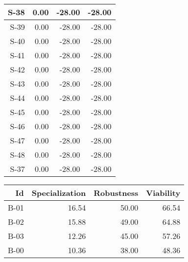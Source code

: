 \begin{tabular}{ | r | r | r | r | }
    \hline
                  S-38  &            0.00  &          -28.00  &          -28.00  \\
    \hline
                  S-39  &            0.00  &          -28.00  &          -28.00  \\
    \hline
                  S-40  &            0.00  &          -28.00  &          -28.00  \\
    \hline
                  S-41  &            0.00  &          -28.00  &          -28.00  \\
    \hline
                  S-42  &            0.00  &          -28.00  &          -28.00  \\
    \hline
                  S-43  &            0.00  &          -28.00  &          -28.00  \\
    \hline
                  S-44  &            0.00  &          -28.00  &          -28.00  \\
    \hline
                  S-45  &            0.00  &          -28.00  &          -28.00  \\
    \hline
                  S-46  &            0.00  &          -28.00  &          -28.00  \\
    \hline
                  S-47  &            0.00  &          -28.00  &          -28.00  \\
    \hline
                  S-48  &            0.00  &          -28.00  &          -28.00  \\
    \hline
                  S-37  &            0.00  &          -28.00  &          -28.00  \\
    \hline
\end{tabular}


\begin{tabular}{ | r | r | r | r | }
    \hline
                    Id  &  Specialization  &      Robustness  &       Viability  \\
    \hline
    \hline
                  B-01  &           16.54  &           50.00  &           66.54  \\
    \hline
                  B-02  &           15.88  &           49.00  &           64.88  \\
    \hline
                  B-03  &           12.26  &           45.00  &           57.26  \\
    \hline
                  B-00  &           10.36  &           38.00  &           48.36  \\
    \hline
\end{tabular}


